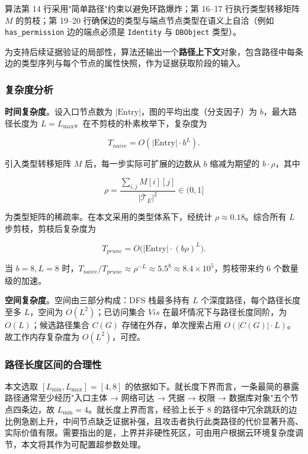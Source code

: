 \documentclass[a4paper,12pt]{ctexart}
\begin{document}
算法第 14 行采用"简单路径"约束以避免环路爆炸；第 16–17 行执行类型转移矩阵 $M$ 的剪枝；第 19–20 行确保边的类型与端点节点类型在语义上自洽（例如 \texttt{has\_permission} 边的端点必须是 \texttt{Identity} 与 \texttt{DBObject} 类型）。

为支持后续证据验证的局部性，算法还输出一个\textbf{路径上下文}对象，包含路径中每条边的类型序列与每个节点的属性快照，作为证据获取阶段的输入。

\subsubsection{复杂度分析}

\textbf{时间复杂度}。设入口节点数为 $|\text{Entry}|$，图的平均出度（分支因子）为 $b$，最大路径长度为 $L = L_{\max}$。在不剪枝的朴素枚举下，复杂度为

\[
T_{naive} = O(|\text{Entry}| \cdot b^{L}).
\]

引入类型转移矩阵 $M$ 后，每一步实际可扩展的边数从 $b$ 缩减为期望的 $b \cdot \rho$，其中

\[
\rho = \frac{\sum_{i,j} M[i][j]}{|\mathcal{T}_E|^2} \in (0,1]
\]

为类型矩阵的稀疏率。在本文采用的类型体系下，经统计 $\rho \approx 0.18$。综合所有 $L$ 步剪枝，剪枝后复杂度为

\[
T_{prune} = O\bigl(|\text{Entry}| \cdot (b\rho)^{L}\bigr).
\]

当 $b=8, L=8$ 时，$T_{naive}/T_{prune} \approx \rho^{-L} \approx 5.5^8 \approx 8.4\times10^5$，剪枝带来约 6 个数量级的加速。

\textbf{空间复杂度}。空间由三部分构成：DFS 栈最多持有 $L$ 个深度路径，每个路径长度至多 $L$，空间为 $O(L^2)$；已访问集合 $Vis$ 在最坏情况下与路径长度同阶，为 $O(L)$；候选路径集合 $C(G)$ 存储在外存，单次搜索占用 $O(|C(G)| \cdot L)$。故工作内存复杂度为 $O(L^2)$，可控。

\subsubsection{路径长度区间的合理性}

本文选取 $[L_{\min}, L_{\max}] = [4, 8]$ 的依据如下。就长度下界而言，一条最简的暴露路径通常至少经历"入口主体 → 网络可达 → 凭据 → 权限 → 数据库对象"五个节点四条边，故 $L_{\min}=4$。就长度上界而言，经验上长于 8 的路径中冗余跳跃的边比例急剧上升，中间节点缺乏证据补强，且攻击者执行此类路径的代价显著升高、实际价值有限。需要指出的是，上界并非硬性死区，可由用户根据云环境复杂度调节，本文将其作为可配置超参数处理。
\end{document}
